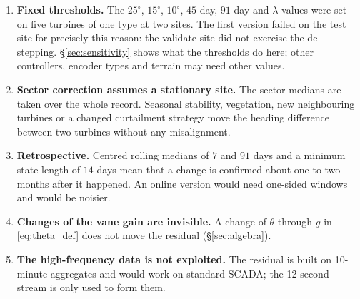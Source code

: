 \documentclass[11pt,a4paper]{article}
\theoremstyle{remark}
\newcommand{\dg}{^{\circ}}
\begin{document}
\begin{enumerate}
      returns. A real fault of that shape, for example a loose vane that is
      fixed after a month, is not reported.
\item \textbf{Fixed thresholds.} The $25\dg$, $15\dg$, $10\dg$, $45$-day,
      $91$-day and $\lambda$ values were set on five turbines of one type at
      two sites. The first version failed on the test site for precisely this
      reason: the validate site did not exercise the de-stepping.
      \S\ref{sec:sensitivity} shows what the thresholds do here; other
      controllers, encoder types and terrain may need other values.
\item \textbf{Sector correction assumes a stationary site.} The sector
      medians are taken over the whole record. Seasonal stability, vegetation,
      new neighbouring turbines or a changed curtailment strategy move the
      heading difference between two turbines without any misalignment.
\item \textbf{Retrospective.} Centred rolling medians of $7$ and $91$ days and
      a minimum state length of $14$ days mean that a change is confirmed
      about one to two months after it happened. An online version would need
      one-sided windows and would be noisier.
\item \textbf{Changes of the vane gain are invisible.} A change of $\theta$
      through $g$ in \eqref{eq:theta_def} does not move the residual
      (\S\ref{sec:algebra}).
\item \textbf{The high-frequency data is not exploited.} The residual is
      built on 10-minute aggregates and would work on standard SCADA; the
      12-second stream is only used to form them.
\end{enumerate}
\end{document}

